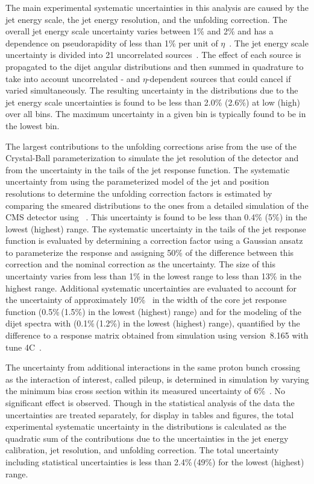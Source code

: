 \documentclass[11pt,twoside,a4paper,cmspaper,final,collab]{cms-tdr}
\begin{document}
The main experimental systematic uncertainties in this analysis are
caused by the jet energy scale, the jet energy resolution, and
the unfolding correction. The overall jet energy scale uncertainty
varies between 1\% and 2\% and has a dependence on pseudorapidity of
less than 1\% per unit of $\eta$~\cite{bib_jecjinst}.
The jet energy scale uncertainty is divided into 21 uncorrelated sources~\cite{Collaboration:2014dp}.
The effect of each source is propagated to the dijet angular distributions
and then summed in quadrature to take into account uncorrelated
\pt- and $\eta$-dependent sources that could cancel if
varied simultaneously. The resulting
uncertainty in the \chijj distributions due to the jet energy
scale uncertainties is found to be less than 2.0\% (2.6\%) at
low (high) \mjj over all \chijj bins. The maximum uncertainty in a given \mjj bin is typically found to be in the lowest \chijj bin.

The largest contributions to the unfolding corrections arise from
the use of the Crystal-Ball parameterization to simulate the jet \pt resolution of the
detector and from the uncertainty in the tails of the jet response
function. The systematic uncertainty from using the parameterized
model of the jet \pt and position resolutions to determine the unfolding correction factors
is estimated by comparing the smeared \chijj distributions to the
ones from a detailed simulation of the CMS detector using
\GEANTfour~\cite{Agostinelli:2002hh}. This uncertainty is found to be
less than 0.4\% (5\%) in the lowest (highest) \mjj range. The systematic uncertainty in the tails of the jet
response function is evaluated by determining a correction factor using a
Gaussian ansatz to parameterize the response and assigning 50\% of the
difference between this correction and the nominal correction as the
uncertainty. The size of this uncertainty varies from less than 1\% in
the lowest \mjj range to less than 13\% in the highest \mjj
range.  Additional systematic uncertainties are evaluated to account
for the uncertainty of approximately 10\%~\cite{bib_jecjinst} in the width of the core jet response function (0.5\%\,(1.5\%) in the lowest (highest) \mjj range) and for the modeling of
the dijet spectra with \HERWIGpp (0.1\%\,(1.2\%) in the lowest
(highest) \mjj range), quantified by the difference to a response matrix obtained from simulation
using \PYTHIAE version~8.165 with tune
4C~\cite{Sjostrand:2007gs}.


The uncertainty from additional interactions in the same
proton bunch crossing as the interaction of interest, called pileup,
is determined in simulation by varying the minimum bias
cross section within its measured uncertainty of 6\%~\cite{minbiasxsec}.
No significant effect is observed. Though in the statistical analysis
of the data the uncertainties are treated separately, for display in
tables and figures, the total experimental systematic uncertainty in the
\chijj distributions is calculated as the quadratic sum of the
contributions due to the uncertainties in the jet energy calibration,
jet \pt resolution, and unfolding correction. The total uncertainty including
statistical uncertainties is less than 2.4\%\,(49\%) for the lowest (highest) \mjj range.
\end{document}
